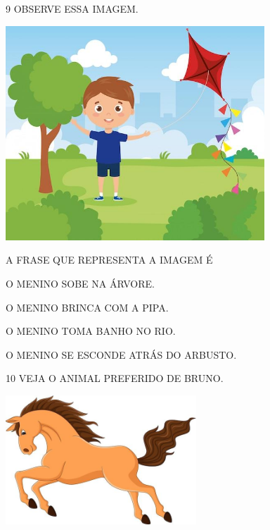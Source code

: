 \num{9} OBSERVE ESSA IMAGEM.

\includegraphics[width=3.84043in,height=3.16853in]{media/image233.jpg}


A FRASE QUE REPRESENTA A IMAGEM É

\begin{escolha}
\item O MENINO SOBE NA ÁRVORE.

\item O MENINO BRINCA COM A PIPA.

\item O MENINO TOMA BANHO NO RIO.

\item O MENINO SE ESCONDE ATRÁS DO ARBUSTO.
\end{escolha}

\num{10} VEJA O ANIMAL PREFERIDO DE BRUNO.

\includegraphics[width=2.82210in,height=1.90975in]{media/image234.jpg}

